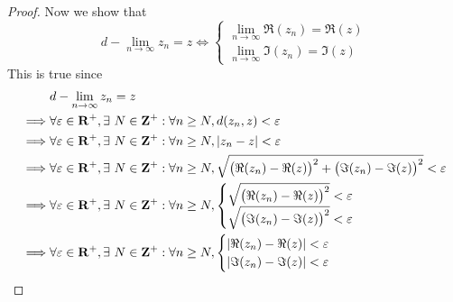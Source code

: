 \begin{proof}
    Now we show that
    \[
        d - \lim_{n \to \infty} z_n = z \iff \begin{cases}
            \lim_{n \to \infty} \Re(z_n) = \Re(z) \\
            \lim_{n \to \infty} \Im(z_n) = \Im(z)
        \end{cases}
    \]
    This is true since
    \begin{align*}
                 & d - \lim_{n \to \infty} z_n = z                                                                                                                                          \\
        \implies & \forall \varepsilon \in \mathbf{R}^+, \exists\ N \in \mathbf{Z}^+ : \forall n \geq N, d(z_n, z) < \varepsilon                                                            \\
        \implies & \forall \varepsilon \in \mathbf{R}^+, \exists\ N \in \mathbf{Z}^+ : \forall n \geq N, \abs*{z_n - z} < \varepsilon                                                       \\
        \implies & \forall \varepsilon \in \mathbf{R}^+, \exists\ N \in \mathbf{Z}^+ : \forall n \geq N, \sqrt{\big(\Re(z_n) - \Re(z)\big)^2 + \big(\Im(z_n) - \Im(z)\big)^2} < \varepsilon \\
        \implies & \forall \varepsilon \in \mathbf{R}^+, \exists\ N \in \mathbf{Z}^+ : \forall n \geq N, \begin{cases}
                                                                                                             \sqrt{\big(\Re(z_n) - \Re(z)\big)^2} < \varepsilon \\
                                                                                                             \sqrt{\big(\Im(z_n) - \Im(z)\big)^2} < \varepsilon
                                                                                                         \end{cases}                                 \\
        \implies & \forall \varepsilon \in \mathbf{R}^+, \exists\ N \in \mathbf{Z}^+ : \forall n \geq N, \begin{cases}
                                                                                                             \abs*{\Re(z_n) - \Re(z)} < \varepsilon \\
                                                                                                             \abs*{\Im(z_n) - \Im(z)} < \varepsilon
                                                                                                         \end{cases}                                             \\

\end{align*}
\end{proof}
